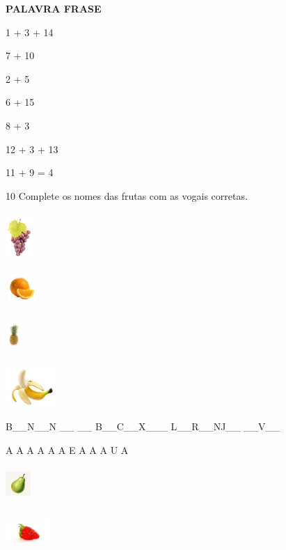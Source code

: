 \textbf{PALAVRA FRASE}

1 + 3 + 14

7 + 10

2 + 5

6 + 15

8 + 3

12 + 3 + 13

11 + 9 = 4

\num{10} Complete os nomes das frutas com as vogais corretas.


\includegraphics[width=0.42675in,height=0.72128in]{media/image69.jpeg}

\includegraphics[width=0.47708in,height=0.42778in]{media/image70.jpeg}

\includegraphics[width=0.24167in,height=0.56597in]{media/image71.jpeg}

\includegraphics[width=0.74522in,height=0.61494in]{media/image72.jpeg}

B\_\_N\_\_N \_\_ \_\_ B\_\_C\_\_X\_\_\_ L\_\_R\_\_NJ\_\_ \_\_V\_\_

A A A A A A E A A A U A

\includegraphics[width=0.37580in,height=0.49340in]{media/image73.jpeg}

\includegraphics[width=0.67500in,height=0.56111in]{media/image74.jpeg}


